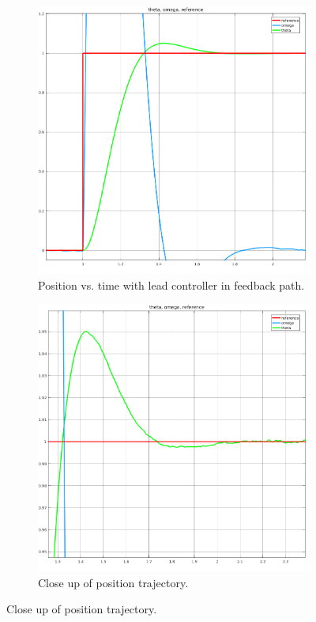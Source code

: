 \documentclass[11pt,a4paper]{article}
\begin{document}
\begin{figure}[!htbp]
	\centering
	\begin{subfigure}{.5\textwidth}
		\centering
		\includegraphics[width = \textwidth]{imglab/lab4sol_leadtrajfeedback.png}
		\caption{Position vs. time with lead controller in feedback path.}
	\end{subfigure}%
	\begin{subfigure}{.5\textwidth}
		\centering
		\includegraphics[width = \textwidth]{imglab/lab4sol_leadtrajfeedbackclose.png}
		\caption{Close up of position trajectory.}	
	\end{subfigure}
\end{figure}
\end{document}
